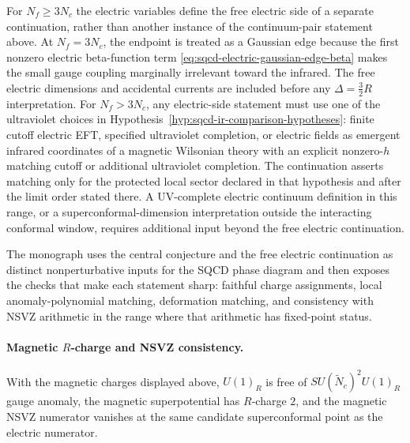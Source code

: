 \begin{conjecture}
\label{conj:sqcd-free-electric-continuation}
For \(N_f\ge 3N_c\) the electric variables define the free electric side of a
separate continuation, rather than another instance of the continuum-pair
statement above.  At \(N_f=3N_c\), the endpoint is treated as a Gaussian edge
because the first nonzero electric beta-function term
\eqref{eq:sqcd-electric-gaussian-edge-beta} makes the small gauge coupling
marginally irrelevant toward the infrared.  The free electric dimensions and
accidental currents are included before any \(\Delta=\frac32R\)
interpretation.  For \(N_f>3N_c\), any electric-side statement must use one of
the ultraviolet choices in
Hypothesis~\ref{hyp:sqcd-ir-comparison-hypotheses}: finite cutoff electric
EFT, specified ultraviolet completion, or electric fields as emergent
infrared coordinates of a magnetic Wilsonian theory with an explicit
nonzero-\(h\) matching cutoff or additional ultraviolet completion.  The
continuation asserts matching only for the protected local sector declared in
that hypothesis and after the limit order stated there.  A UV-complete
electric continuum definition in this range, or a superconformal-dimension
interpretation outside the interacting conformal window, requires additional
input beyond the free electric continuation.
\end{conjecture}

The monograph uses the central conjecture and the free electric continuation
as distinct nonperturbative inputs for the SQCD phase diagram and then exposes
the checks that make each statement sharp: faithful charge assignments, local
anomaly-polynomial matching, deformation matching, and consistency with NSVZ
arithmetic in the range where that arithmetic has fixed-point status.

\paragraph{Magnetic \(R\)-charge and NSVZ consistency.}
With the magnetic charges displayed above, \(U(1)_R\) is free of
\(SU(\widetilde N_c)^2U(1)_R\) gauge anomaly, the magnetic superpotential
has \(R\)-charge \(2\), and the magnetic NSVZ numerator vanishes at the same
candidate superconformal point as the electric numerator.

